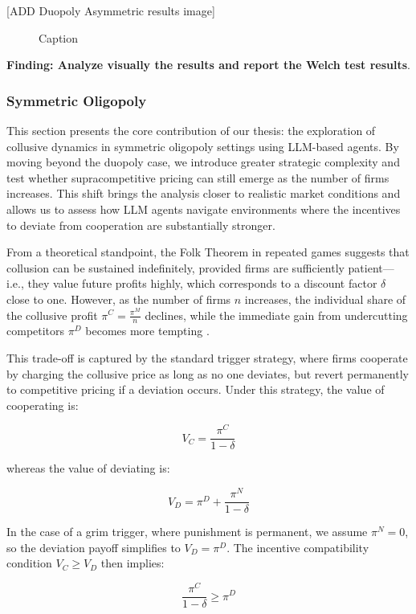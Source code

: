 [ADD Duopoly Asymmetric results image]
\begin{figure}[H]
    \centering
    \caption{Caption}
    \label{fig:enter-label}
\end{figure}
\textbf{Finding: Analyze visually the results and report the Welch test results}.



\subsubsection*{Symmetric Oligopoly}

This section presents the core contribution of our thesis: the exploration of collusive dynamics in symmetric oligopoly settings using LLM-based agents. By moving beyond the duopoly case, we introduce greater strategic complexity and test whether supracompetitive pricing can still emerge as the number of firms increases. This shift brings the analysis closer to realistic market conditions and allows us to assess how LLM agents navigate environments where the incentives to deviate from cooperation are substantially stronger.

From a theoretical standpoint, the Folk Theorem in repeated games suggests that collusion can be sustained indefinitely, provided firms are sufficiently patient—i.e., they value future profits highly, which corresponds to a discount factor $\delta$ close to one. However, as the number of firms $n$ increases, the individual share of the collusive profit $\pi^C = \frac{\pi^M}{n}$ declines, while the immediate gain from undercutting competitors $\pi^D$ becomes more tempting \parencite{ivaldi_chapter_2007, tirole_theory_1988}.

This trade-off is captured by the standard trigger strategy, where firms cooperate by charging the collusive price as long as no one deviates, but revert permanently to competitive pricing if a deviation occurs. Under this strategy, the value of cooperating is:

$$V_C = \frac{\pi^C}{1 - \delta}$$

whereas the value of deviating is:

$$V_D = \pi^D + \frac{\pi^N}{1 - \delta}$$

In the case of a grim trigger, where punishment is permanent, we assume $\pi^N = 0$, so the deviation payoff simplifies to $V_D = \pi^D$. The incentive compatibility condition $V_C \geq V_D$ then implies:

$$\frac{\pi^C}{1 - \delta} \geq \pi^D$$

